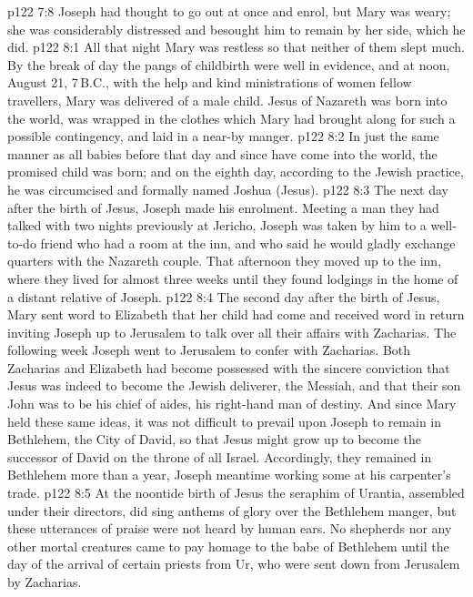 \vs p122 7:8 Joseph had thought to go out at once and enrol, but Mary was weary; she was considerably distressed and besought him to remain by her side, which he did.
\vs p122 8:1 All that night Mary was restless so that neither of them slept much. By the break of day the pangs of childbirth were well in evidence, and at noon, August 21, 7\,B.C., with the help and kind ministrations of women fellow travellers, Mary was delivered of a male child. Jesus of Nazareth was born into the world, was wrapped in the clothes which Mary had brought along for such a possible contingency, and laid in a near\hyp{}by manger.
\vs p122 8:2 In just the same manner as all babies before that day and since have come into the world, the promised child was born; and on the eighth day, according to the Jewish practice, he was circumcised and formally named Joshua (Jesus).
\vs p122 8:3 The next day after the birth of Jesus, Joseph made his enrolment. Meeting a man they had talked with two nights previously at Jericho, Joseph was taken by him to a well\hyp{}to\hyp{}do friend who had a room at the inn, and who said he would gladly exchange quarters with the Nazareth couple. That afternoon they moved up to the inn, where they lived for almost three weeks until they found lodgings in the home of a distant relative of Joseph.
\vs p122 8:4 The second day after the birth of Jesus, Mary sent word to Elizabeth that her child had come and received word in return inviting Joseph up to Jerusalem to talk over all their affairs with Zacharias. The following week Joseph went to Jerusalem to confer with Zacharias. Both Zacharias and Elizabeth had become possessed with the sincere conviction that Jesus was indeed to become the Jewish deliverer, the Messiah, and that their son John was to be his chief of aides, his right\hyp{}hand man of destiny. And since Mary held these same ideas, it was not difficult to prevail upon Joseph to remain in Bethlehem, the City of David, so that Jesus might grow up to become the successor of David on the throne of all Israel. Accordingly, they remained in Bethlehem more than a year, Joseph meantime working some at his carpenter’s trade.
\vs p122 8:5 \pc At the noontide birth of Jesus the seraphim of Urantia, assembled under their directors, did sing anthems of glory over the Bethlehem manger, but these utterances of praise were not heard by human ears. No shepherds nor any other mortal creatures came to pay homage to the babe of Bethlehem until the day of the arrival of certain priests from Ur, who were sent down from Jerusalem by Zacharias.
